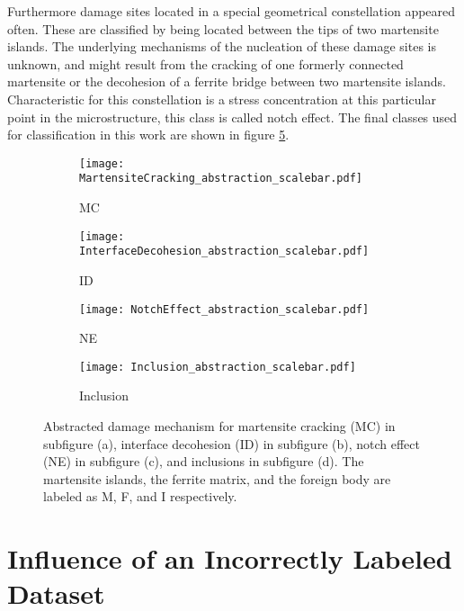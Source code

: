 Furthermore damage sites located in a special geometrical constellation appeared often. These are classified by being located between the tips of two martensite islands. The underlying mechanisms of the nucleation of these damage sites is unknown, and might result from the cracking of one formerly connected martensite or the decohesion of a ferrite bridge between two martensite islands. Characteristic for this constellation is a stress concentration at this particular point in the microstructure, this class is called notch effect. The final classes used for classification in this work are shown in figure \ref{fig:classes}.

\begin{figure}[H]
\begin{subfigure}{.25\textwidth}
\centering
  \texttt{[image: MartensiteCracking\_abstraction\_scalebar.pdf]}
  \caption{MC}
  \label{fig:MC}
\end{subfigure}%
\begin{subfigure}{.25\textwidth}
\centering
  \texttt{[image: InterfaceDecohesion\_abstraction\_scalebar.pdf]}
  \caption{ID}
  \label{fig:Interface_scalebar}
\end{subfigure}%
\centering
\begin{subfigure}{.25\textwidth}
\centering
  \texttt{[image: NotchEffect\_abstraction\_scalebar.pdf]}
  \caption{NE}
  \label{fig:Notch_scalebar}
\end{subfigure}%
\begin{subfigure}{.25\textwidth}
\centering
  \texttt{[image: Inclusion\_abstraction\_scalebar.pdf]}
  \caption{Inclusion}
  \label{fig:Inclusion_scalebar}
\end{subfigure}%
\caption{Abstracted damage mechanism for martensite cracking (MC) in subfigure (a), interface decohesion (ID) in subfigure (b), notch effect (NE) in subfigure (c),  and inclusions in subfigure (d). The martensite islands, the ferrite matrix, and the foreign body are labeled as M, F, and I respectively.}
\label{fig:classes}
\end{figure}



\section{Influence of an Incorrectly Labeled Dataset}

